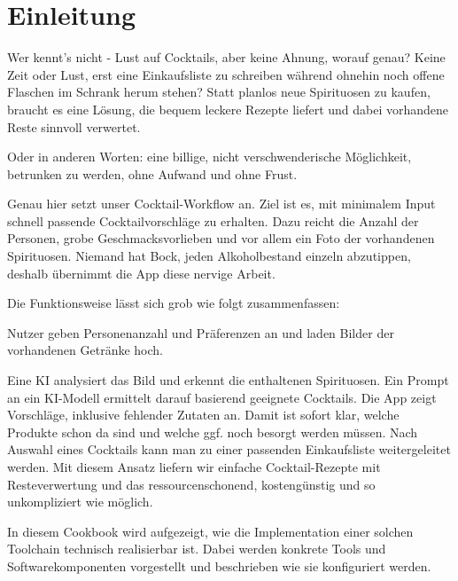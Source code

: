 \section{Einleitung}\label{sec:einleitung} %
Wer kennt’s nicht - Lust auf Cocktails, aber keine Ahnung, worauf genau? Keine Zeit oder Lust, erst
eine Einkaufsliste zu schreiben während ohnehin noch offene Flaschen im Schrank herum stehen? Statt
planlos neue Spirituosen zu kaufen, braucht es eine Lösung, die bequem leckere Rezepte liefert und
dabei vorhandene Reste sinnvoll verwertet.

Oder in anderen Worten: eine billige, nicht verschwenderische Möglichkeit, betrunken zu werden, ohne
Aufwand und ohne Frust.

Genau hier setzt unser Cocktail-Workflow an. Ziel ist es, mit minimalem Input schnell passende
Cocktailvorschläge zu erhalten. Dazu reicht die Anzahl der Personen, grobe Geschmacksvorlieben und
vor allem ein Foto der vorhandenen Spirituosen. Niemand hat Bock, jeden Alkoholbestand einzeln
abzutippen, deshalb übernimmt die App diese nervige Arbeit.

Die Funktionsweise lässt sich grob wie folgt zusammenfassen:

Nutzer geben Personenanzahl und Präferenzen an und laden Bilder der vorhandenen Getränke hoch.

Eine KI analysiert das Bild und erkennt die enthaltenen Spirituosen. Ein Prompt an ein KI-Modell
ermittelt darauf basierend geeignete Cocktails. Die App zeigt Vorschläge, inklusive fehlender
Zutaten an. Damit ist sofort klar, welche Produkte schon da sind und welche ggf. noch besorgt werden
müssen. Nach Auswahl eines Cocktails kann man zu einer passenden Einkaufsliste weitergeleitet
werden. Mit diesem Ansatz liefern wir einfache Cocktail-Rezepte mit Resteverwertung und das
ressourcenschonend, kostengünstig und so unkompliziert wie möglich.

In diesem Cookbook wird aufgezeigt, wie die Implementation einer solchen Toolchain technisch
realisierbar ist. Dabei werden konkrete Tools und Softwarekomponenten vorgestellt und beschrieben
wie sie konfiguriert werden.
